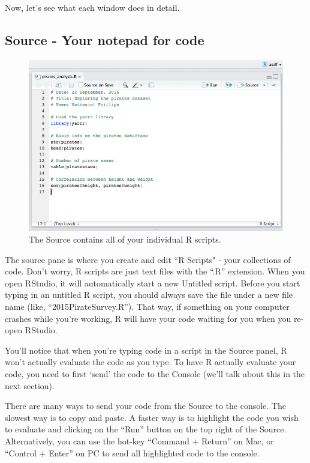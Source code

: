 \documentclass[]{book}
\theoremstyle{definition}
\theoremstyle{definition}
\theoremstyle{remark}
\begin{document}
Now, let's see what each window does in detail.

\subsection{Source - Your notepad for
code}\label{source---your-notepad-for-code}

\begin{figure}
\includegraphics[width=600px]{images/piratesanalysisss} \caption{The Source contains all of your individual R scripts.}\label{fig:sourcewindow}
\end{figure}

The source pane is where you create and edit ``R Scripts" - your
collections of code. Don't worry, R scripts are just text files with the
``.R'' extension. When you open RStudio, it will automatically start a
new Untitled script. Before you start typing in an untitled R script,
you should always save the file under a new file name (like,
``2015PirateSurvey.R''). That way, if something on your computer crashes
while you're working, R will have your code waiting for you when you
re-open RStudio.

You'll notice that when you're typing code in a script in the Source
panel, R won't actually evaluate the code as you type. To have R
actually evaluate your code, you need to first `send' the code to the
Console (we'll talk about this in the next section).

There are many ways to send your code from the Source to the console.
The slowest way is to copy and paste. A faster way is to highlight the
code you wish to evaluate and clicking on the ``Run'' button on the top
right of the Source. Alternatively, you can use the hot-key ``Command +
Return'' on Mac, or ``Control + Enter'' on PC to send all highlighted
code to the console.
\end{document}
